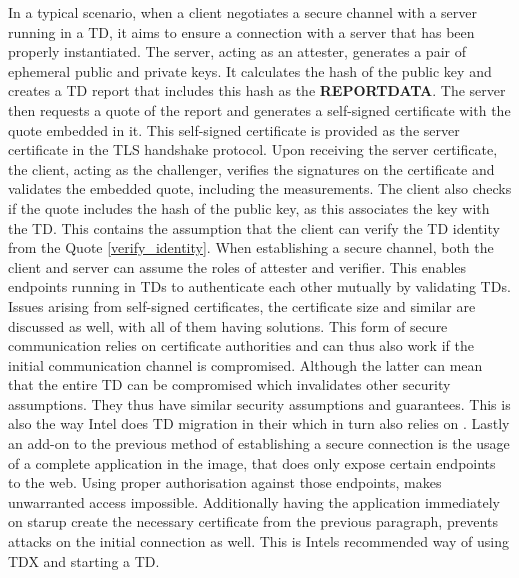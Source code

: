 In a typical scenario, when a client negotiates a secure channel with a server running in a TD, it aims to ensure a connection with a server that has been properly instantiated. The server, acting as an attester, generates a pair of ephemeral public and private keys. It calculates the hash of the public key and creates a TD report that includes this hash as the \textbf{REPORTDATA}. The server then requests a quote of the report and generates a self-signed certificate with the quote embedded in it. This self-signed certificate is provided as the server certificate in the TLS handshake protocol. Upon receiving the server certificate, the client, acting as the challenger, verifies the signatures on the certificate and validates the embedded quote, including the measurements. The client also checks if the quote includes the hash of the public key, as this associates the key with the TD. This contains the assumption that the client can verify the TD identity from the Quote \ref{verify_identity}. When establishing a secure channel, both the client and server can assume the roles of attester and verifier. This enables endpoints running in TDs to authenticate each other mutually by validating TDs\cite{knauth_integrating_2019}. Issues arising from self-signed certificates, the certificate size and similar are discussed as well, with all of them  having solutions. This form of secure communication relies on certificate authorities and can thus also work if the initial communication channel is compromised. Although the latter can mean that the entire TD can be compromised which invalidates other security assumptions. They thus have similar security assumptions and guarantees. This is also the way Intel does TD migration in their \cite{intel_corporation_td_migration_design_2023} which in turn also relies on \cite{knauth_integrating_2019}.
Lastly an add-on to the previous method of establishing a secure connection is the usage of a complete application in the image, that does only expose certain endpoints to the web. Using proper authorisation against those endpoints, makes unwarranted access impossible. Additionally having the application immediately on starup create the necessary certificate from the previous paragraph, prevents attacks on the initial connection as well. This is Intels recommended way of using TDX and starting a TD. 
